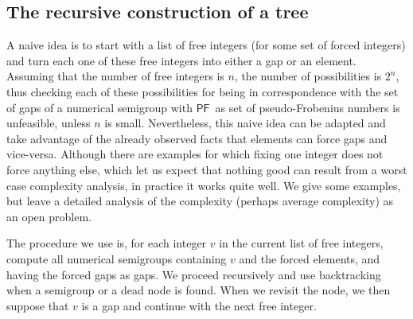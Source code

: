 \documentclass[11pt]{amsart}
\theoremstyle{remark}
\begin{document}
\subsection{The recursive construction of a tree}
\label{subsec:recursive_construction_tree}
A naive idea is to start with a list of free integers (for some set of forced integers) and turn each one of these free integers into either a gap or an element. Assuming that the number of free integers is $n$, the number of possibilities is $2^n$, thus checking each of these possibilities for being in correspondence with the set of gaps of a numerical semigroup with {\ensuremath{\mathsf{PF}}}\ as set of pseudo-Frobenius numbers is unfeasible, unless $n$ is small. Nevertheless, this naive idea can be adapted and take advantage of the already observed facts that elements can force gaps and vice-versa. Although there are examples for which fixing one integer does not force anything else, which let us expect that nothing good can result from a worst case complexity analysis, in practice it works quite well. We give some examples, but leave a detailed analysis of the  complexity (perhaps average complexity) as an open problem.

The procedure we use is, for each integer $v$ in the current list of free integers, compute all numerical semigroups containing $v$ and the forced elements, and having the forced gaps as gaps. We proceed recursively and  use backtracking when a semigroup 
or a dead node is found.  When we revisit the node, we then suppose that $v$ is a gap and continue with the next free integer. 
\end{document}
